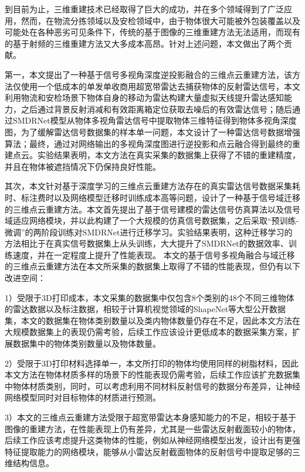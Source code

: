 到目前为止，三维重建技术已经取得了巨大的成功，并在多个领域得到了广泛应用，然而，在物流分拣领域以及安检领域中，由于物体很大可能被外包装覆盖以及可能处在各种恶劣可见条件下，传统的基于图像的三维重建方法无法适用，而现有的基于射频的三维重建方法又大多成本高昂。针对上述问题，本文做出了两个贡献。

第一，本文提出了一种基于信号多视角深度逆投影融合的三维点云重建方法，该方法仅使用一个低成本的单发单收商用超宽带雷达去捕获物体的反射雷达信号，本文利用物流和安检场景下物体自身的移动为雷达构建大量虚拟天线提升雷达感知能力，之后通过背景反射消减和有效距离箱定位获取去噪后的有效雷达信号；随后通过SMDRNet模型从物体多视角雷达信号中提取物体三维特征得到物体多视角深度图，为了缓解雷达信号数据集的样本单一问题，本文设计了一种雷达信号数据增强算法；最终，通过对网络输出的多视角深度图进行逆投影和点云融合得到最终的重建点云。实验结果表明，本文方法在真实采集的数据集上获得了不错的重建精度，并且在物体被遮挡情况下仍保持良好性能。

其次，本文针对基于深度学习的三维点云重建方法存在的真实雷达信号数据采集耗时、标注费时以及网络模型迁移时训练成本高等问题，设计了一种基于信号域迁移的三维点云重建方法。本文首先提出了基于信号建模的雷达信号仿真算法以及信号域适应网络模块，并以此构建了一个大规模的仿真信号数据集，之后采取“预训练-微调”的两阶段训练对SMDRNet进行迁移学习。实验结果表明，这种迁移学习的方法相比于在真实信号数据集上从头训练，大大提升了SMDRNet的数据效率、训练速度，并在一定程度上提升了性能表现。
本文的基于信号多视角融合与域迁移的三维点云重建方法在本文所采集的数据集上取得了不错的性能表现，但仍有以下改进空间：

1）受限于3D打印成本，本文采集的数据集中仅包含8个类别的48个不同三维物体的雷达数据以及标注数据，相较于计算机视觉领域的ShapeNet等大型公开数据集，本文的数据集在物体类别数量以及类内物体数量仍存在不足，因此本文方法在大规模数据集上的表现仍需考验，后续工作应该设计更低成本的数据采集方案，扩展数据集中的物体类别数量以及物体数量。

2）受限于3D打印材料选择单一，本文所打印的物体均使用同样的树脂材料，因此本文方法在物体材质多样的场景下的性能表现仍需考验，后续工作应该扩充数据集中物体材质类别，同时，可以考虑利用不同材料反射信号的数据分布差异，让神经网络模型同时对目标物体的材质进行预测。

3）本文的三维点云重建方法受限于超宽带雷达本身感知能力的不足，相较于基于图像的重建方法，在性能表现上仍有差异，尤其是一些雷达反射截面较小的物体，后续工作应该考虑提升这类物体的性能，例如从神经网络模型出发，设计出有更强特征提取能力的网络模块，能够从小雷达反射截面物体的反射信号中提取足够的三维结构信息。